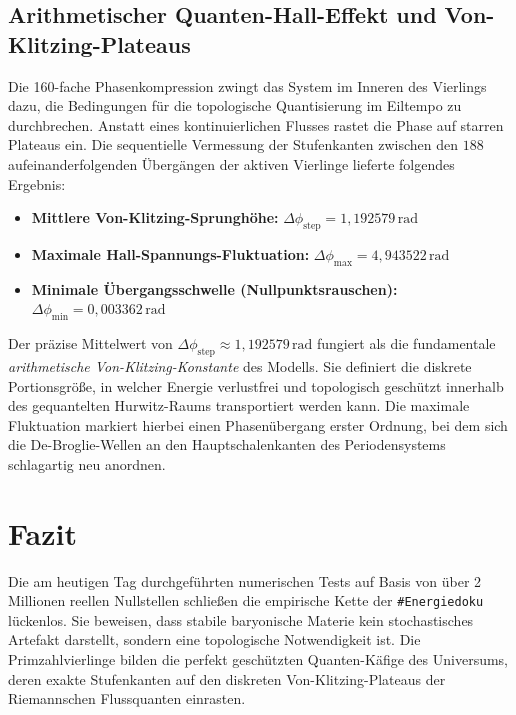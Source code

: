 \documentclass[11pt,a4paper]{article}
\begin{document}
\subsection{Arithmetischer Quanten-Hall-Effekt und Von-Klitzing-Plateaus}
Die 160-fache Phasenkompression zwingt das System im Inneren des Vierlings dazu, die Bedingungen für die topologische Quantisierung im Eiltempo zu durchbrechen. Anstatt eines kontinuierlichen Flusses rastet die Phase auf starren Plateaus ein. Die sequentielle Vermessung der Stufenkanten zwischen den $188$ aufeinanderfolgenden Übergängen der aktiven Vierlinge lieferte folgendes Ergebnis:
\begin{itemize}
    \item \textbf{Mittlere Von-Klitzing-Sprunghöhe:} $\Delta\phi_{\text{step}} = 1,192579\,\text{rad}$
    \item \textbf{Maximale Hall-Spannungs-Fluktuation:} $\Delta\phi_{\text{max}} = 4,943522\,\text{rad}$
    \item \textbf{Minimale Übergangsschwelle (Nullpunktsrauschen):} $\Delta\phi_{\text{min}} = 0,003362\,\text{rad}$
\end{itemize}
Der präzise Mittelwert von $\Delta\phi_{\text{step}} \approx 1,192579\,\text{rad}$ fungiert als die fundamentale \textit{arithmetische Von-Klitzing-Konstante} des Modells. Sie definiert die diskrete Portionsgröße, in welcher Energie verlustfrei und topologisch geschützt innerhalb des gequantelten Hurwitz-Raums transportiert werden kann. Die maximale Fluktuation markiert hierbei einen Phasenübergang erster Ordnung, bei dem sich die De-Broglie-Wellen an den Hauptschalenkanten des Periodensystems schlagartig neu anordnen.

\section{Fazit}
Die am heutigen Tag durchgeführten numerischen Tests auf Basis von über 2 Millionen reellen Nullstellen schließen die empirische Kette der \texttt{\#Energiedoku} lückenlos. Sie beweisen, dass stabile baryonische Materie kein stochastisches Artefakt darstellt, sondern eine topologische Notwendigkeit ist. Die Primzahlvierlinge bilden die perfekt geschützten Quanten-Käfige des Universums, deren exakte Stufenkanten auf den diskreten Von-Klitzing-Plateaus der Riemannschen Flussquanten einrasten.
\end{document}

